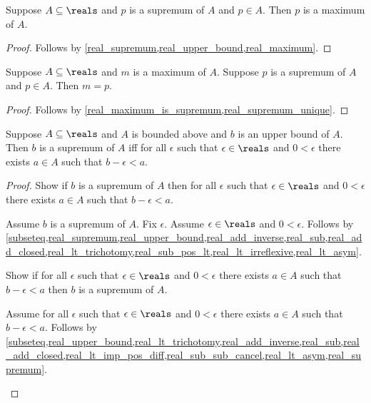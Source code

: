 \begin{proposition}\label{real_supremum_in_set_is_maximum}
    Suppose $A\subseteq\reals$ and $p$ is a supremum of $A$ and $p\in A$.
    Then $p$ is a maximum of $A$.
\end{proposition}
\begin{proof}
    Follows by \cref{real_supremum,real_upper_bound,real_maximum}.
\end{proof}

\begin{proposition}\label{real_maximum_eq_supremum}
    Suppose $A\subseteq\reals$ and $m$ is a maximum of $A$.
    Suppose $p$ is a supremum of $A$ and $p\in A$.
    Then $m = p$.
\end{proposition}
\begin{proof}
    Follows by \cref{real_maximum_is_supremum,real_supremum_unique}.
\end{proof}

\begin{proposition}\label{real_supremum_characterization}
    Suppose $A\subseteq\reals$ and $A$ is bounded above and $b$ is an upper bound of $A$.
    Then $b$ is a supremum of $A$ iff for all $\epsilon$ such that $\epsilon\in\reals$ and $0 < \epsilon$ there exists $a\in A$ such that $b - \epsilon < a$.
\end{proposition}
\begin{proof}
    Show if $b$ is a supremum of $A$ then for all $\epsilon$ such that $\epsilon\in\reals$ and $0 < \epsilon$ there exists $a\in A$ such that $b - \epsilon < a$.
    \begin{subproof}
        Assume $b$ is a supremum of $A$.
        Fix $\epsilon$.
        Assume $\epsilon\in\reals$ and $0 < \epsilon$.
        Follows by \cref{subseteq,real_supremum,real_upper_bound,real_add_inverse,real_sub,real_add_closed,real_lt_trichotomy,real_sub_pos_lt,real_lt_irreflexive,real_lt_asym}.
    \end{subproof}
    Show if for all $\epsilon$ such that $\epsilon\in\reals$ and $0 < \epsilon$ there exists $a\in A$ such that $b - \epsilon < a$ then $b$ is a supremum of $A$.
    \begin{subproof}
        Assume for all $\epsilon$ such that $\epsilon\in\reals$ and $0 < \epsilon$ there exists $a\in A$ such that $b - \epsilon < a$.
        Follows by \cref{subseteq,real_upper_bound,real_lt_trichotomy,real_add_inverse,real_sub,real_add_closed,real_lt_imp_pos_diff,real_sub_sub_cancel,real_lt_asym,real_supremum}.
    \end{subproof}
\end{proof}

